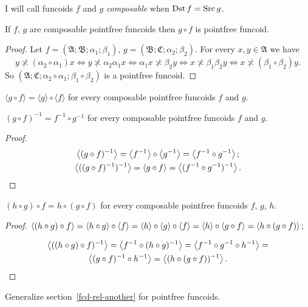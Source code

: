 \begin{defn}
I will call funcoids $f$ and
$g$ \emph{composable} when $\operatorname{Dst} f=\operatorname{Src} g$.\end{defn}
\begin{prop}
If $f$, $g$ are composable pointfree funcoids then $g\circ f$ is
pointfree funcoid.\end{prop}
\begin{proof}
Let $f=(\mathfrak{A};\mathfrak{B};\alpha_{1};\beta_{1})$, $g=(\mathfrak{B};\mathfrak{C};\alpha_{2};\beta_{2})$.
For every $x,y\in\mathfrak{A}$ we have 
\[
y\nasymp(\alpha_{2}\circ\alpha_{1})x\Leftrightarrow y\nasymp\alpha_{2}\alpha_{1}x\Leftrightarrow\alpha_{1}x\nasymp\beta_{2}y\Leftrightarrow x\nasymp\beta_{1}\beta_{2}y\Leftrightarrow x\nasymp(\beta_{1}\circ\beta_{2})y.
\]
So $(\mathfrak{A};\mathfrak{C};\alpha_{2}\circ\alpha_{1};\beta_{1}\circ\beta_{2})$
is a pointfree funcoid.\end{proof}
\begin{obvious}
$\langle g\circ f\rangle=\langle g\rangle\circ\langle f\rangle$ for
every composable pointfree funcoids $f$ and $g$.\end{obvious}
\begin{thm}
$(g\circ f)^{-1}=f^{-1}\circ g^{-1}$ for every composable pointfree
funcoids $f$ and $g$.\end{thm}
\begin{proof}
~
\begin{gather*}
\left\langle (g\circ f)^{-1}\right\rangle=\left\langle f^{-1}\right\rangle\circ\left\langle g^{-1}\right\rangle=\left\langle f^{-1}\circ g^{-1}\right\rangle;\\
\left\langle ((g\circ f)^{-1})^{-1}\right\rangle=\left\langle g\circ f\right\rangle=\left\langle (f^{-1}\circ g^{-1})^{-1}\right\rangle.
\end{gather*}
\end{proof}
\begin{prop}
$(h\circ g)\circ f=h\circ(g\circ f)$ for every composable pointfree
funcoids $f$, $g$, $h$.\end{prop}
\begin{proof}
$\left\langle (h\circ g)\circ f\right\rangle=\left\langle h\circ g\right\rangle\circ\left\langle f\right\rangle=\left\langle h\right\rangle\circ\left\langle g\right\rangle\circ\left\langle f\right\rangle=\left\langle h\right\rangle\circ\left\langle g\circ f\right\rangle=\left\langle h\circ(g\circ f)\right\rangle;$

\begin{multline*}
\left\langle ((h\circ g)\circ f)^{-1}\right\rangle=\left\langle f^{-1}\circ(h\circ g)^{-1}\right\rangle=\left\langle f^{-1}\circ g^{-1}\circ h^{-1}\right\rangle=\\
\left\langle (g\circ f)^{-1}\circ h^{-1}\right\rangle=\left\langle (h\circ(g\circ f))^{-1}\right\rangle.
\end{multline*}
\end{proof}
\begin{xca}
Generalize section~\ref{fcd-rel-another} for pointfree funcoids.
\end{xca}

